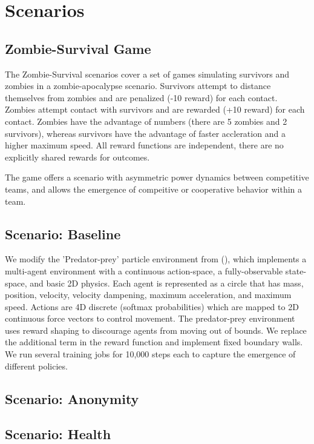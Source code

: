 \documentclass[11pt,a4paper]{article}
\begin{document}
\section{Scenarios}
\label{sec:scenarios}

\subsection{Zombie-Survival Game}
\label{sec:game}

The Zombie-Survival scenarios cover a set of games simulating survivors and zombies in a zombie-apocalypse scenario.
Survivors attempt to distance themselves from zombies and are penalized (-10 reward) for each contact.
Zombies attempt contact with survivors and are rewarded (+10 reward) for each contact.
Zombies have the advantage of numbers (there are 5 zombies and 2 survivors), whereas survivors have the advantage of faster accleration and a higher maximum speed.
All reward functions are independent, there are no explicitly shared rewards for outcomes.

The game offers a scenario with asymmetric power dynamics between competitive teams, and allows the emergence of compeitive or cooperative behavior within a team.

\subsection{Scenario: Baseline}
\label{sec:baseline}

We modify the 'Predator-prey' particle environment from (), which implements a multi-agent environment with a continuous action-space, a fully-observable state-space, and basic 2D physics.
Each agent is represented as a circle that has mass, position, velocity, velocity dampening, maximum acceleration, and maximum speed. Actions are 4D discrete (softmax probabilities) which are mapped to 2D continuous force vectors to control movement. The predator-prey environment uses reward shaping to discourage agents from moving out of bounds.
We replace the additional term in the reward function and implement fixed boundary walls.
We run several training jobs for 10,000 steps each to capture the emergence of different policies.

\subsection{Scenario: Anonymity}
\label{sec:anon}

\subsection{Scenario: Health}
\label{sec:health}
\end{document}
